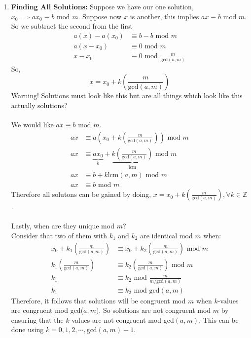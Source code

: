 \documentclass[class=article, crop=false]{standalone}
\def\integers{{\mathbb Z}}
\begin{document}
\begin{enumerate}[1.]
	\item \textbf{Finding All Solutions:} Suppose we have our one solution, $x_0 \implies ax_0 \equiv b\mbox{ mod }m$.
	Suppose now $x$ is another, this implies $ax\equiv b\mbox{ mod }m$. So we subtract the second from the first
	\begin{align*}
		a(x)-a(x_0) &\equiv b-b \mbox{ mod } m\\
		a(x-x_0) &\equiv 0\mbox{ mod } m\\
		x-x_0 &\equiv 0 \mbox{ mod } \frac{m}{\mbox{gcd}(a,m)}
	\end{align*}
	So, $$x=x_0 +k\left(\frac{m}{\mbox{gcd}(a,m)}\right)$$
	{\color{red} Warning!} Solutions must look like this but are all things which look like this actually
	solutions? \\\\
	We would like $ax\equiv b\mbox{ mod }m$.
	\begin{align*}
		ax&\equiv a\left(x_0 +k\left(\frac{m}{\mbox{gcd}(a,m)}\right)\right) \mbox{ mod }m\\
		ax&\equiv \underbrace{ax_0}_{b} + \underbrace{k\left(\frac{m}{\mbox{gcd}(a,m)}\right)}_{\mbox{lcm}} \mbox{ mod }m \\
		ax&\equiv b + k\mbox{lcm}(a,m) \mbox{ mod }m\\
		ax&\equiv b\mbox{ mod }m 
	\end{align*}
	Therefore all solutons can be gained by doing, $x=x_0 +k\left(\frac{m}{\mbox{gcd}(a,m)}\right), \forall k\in\integers$.\\\\
	Lastly, when are they unique mod $m$?\\
	Consider that two of them with $k_1$ and $k_2$ are identical mod $m$ when:
	\begin{align*}
		x_0 + k_1\left(\frac{m}{\mbox{gcd}(a,m)}\right) &\equiv x_0 +k_2\left(\frac{m}{\mbox{gcd}(a,m)}\right) \mbox{ mod }m\\
		k_1\left(\frac{m}{\mbox{gcd}(a,m)}\right) &\equiv k_2\left(\frac{m}{\mbox{gcd}(a,m)}\right) \mbox{ mod }m\\
		k_1 &\equiv k_2\mbox{ mod }\frac{m}{m/\mbox{gcd}(a,m)} \\
		k_1 &\equiv k_2\mbox{ mod }\mbox{gcd}(a,m)
	\end{align*}
	Therefore, it follows that solutions will be congruent mod $m$ when $k$-values are congruent mod gcd($a,m)$.
	So solutions are not congruent mod $m$ by ensuring that the $k$-values are not congruent mod gcd$(a,m)$.
	This can be done using $k=0,1,2,\cdots, \mbox{gcd}(a,m)-1$.


\end{enumerate}
\end{document}

